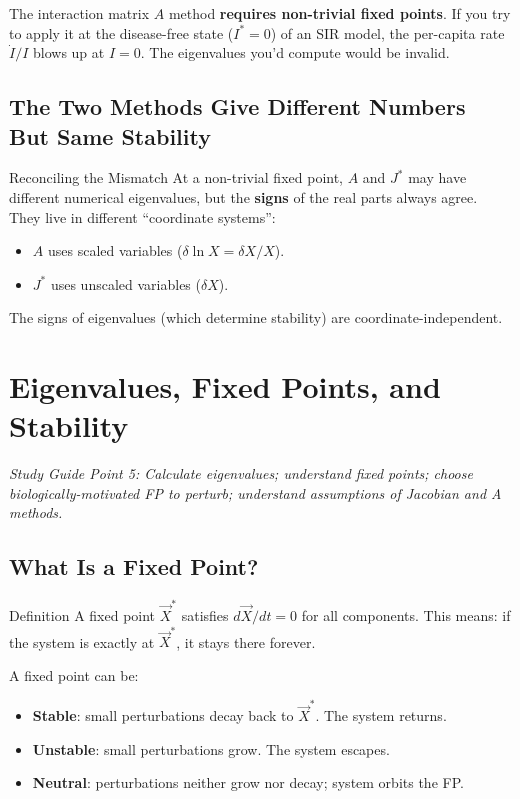 \documentclass[11pt]{article}
\begin{document}
\begin{warnbox}
The interaction matrix $A$ method \textbf{requires non-trivial fixed points}. If you try to apply it at the disease-free state ($I^*=0$) of an SIR model, the per-capita rate $\dot I/I$ blows up at $I=0$. The eigenvalues you'd compute would be invalid.
\end{warnbox}

\subsection{The Two Methods Give Different Numbers But Same Stability}

\begin{intuitionbox}{Reconciling the Mismatch}
At a non-trivial fixed point, $A$ and $J^*$ may have different numerical eigenvalues, but the \textbf{signs} of the real parts always agree. They live in different ``coordinate systems'':
\begin{itemize}
\item $A$ uses scaled variables ($\delta \ln X = \delta X / X$).
\item $J^*$ uses unscaled variables ($\delta X$).
\end{itemize}
The signs of eigenvalues (which determine stability) are coordinate-independent.
\end{intuitionbox}

\section{Eigenvalues, Fixed Points, and Stability}

\textit{Study Guide Point 5: Calculate eigenvalues; understand fixed points; choose biologically-motivated FP to perturb; understand assumptions of Jacobian and A methods.}

\subsection{What Is a Fixed Point?}

\begin{conceptbox}{Definition}
A fixed point $\vec X^*$ satisfies $d\vec X/dt = 0$ for all components. This means: if the system is exactly at $\vec X^*$, it stays there forever.

A fixed point can be:
\begin{itemize}
\item \textbf{Stable}: small perturbations decay back to $\vec X^*$. The system returns.
\item \textbf{Unstable}: small perturbations grow. The system escapes.
\item \textbf{Neutral}: perturbations neither grow nor decay; system orbits the FP.
\end{itemize}
\end{conceptbox}
\end{document}
